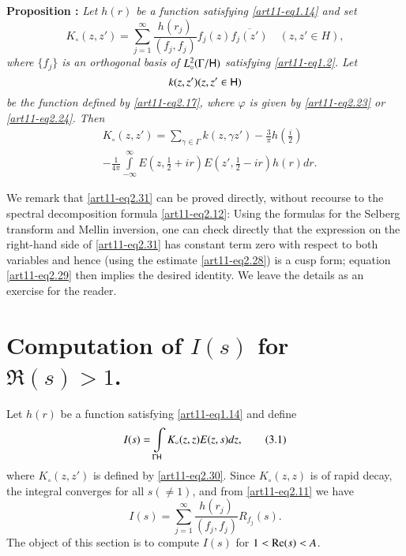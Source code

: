 \medskip
\noindent
{\bfseries Proposition :\label{art11-prop3}}
\textit{Let $h(r)$ be a function satisfying \eqref{art11-eq1.14} and set}
\begin{equation*}
K_\circ (z, z') = \sum\limits^\infty_{j=1} \frac{h(r_j)}{(f_j, f_j)} f_j (z) \overline{f_j (z')} \quad (z, z' \in H), 
\tag{2.30}\label{art11-eq2.30}
\end{equation*}
\textit{where $\{f_j\}$ is an orthogonal basis of $L^2_\circ (\Gamma / \mathsf{H})$ satisfying \eqref{art11-eq1.2}. Let 
$$
k(z,z') (z, z' \in \mathsf{H})
$$ 
be the function defined by \eqref{art11-eq2.17}, where $\varphi$ is given by \eqref{art11-eq2.23} or \eqref{art11-eq2.24}. Then}  
\begin{align*}
& K_\circ (z,z') =\sum\limits_{\gamma \in \Gamma} k (z, \gamma z') - \frac{3}{\pi} h (\frac{i}{2}) \tag{2.31} \label{art11-eq2.31}\\
& -\frac{1}{4\pi} \int\limits^\infty_{-\infty} E (z, \frac{1}{2} + ir) E (z', \frac{1}{2} - ir) h (r) dr. 
\end{align*}\pageoriginale

We remark that \eqref{art11-eq2.31} can be proved directly, without recourse to the spectral decomposition formula \eqref{art11-eq2.12}: Using the formulas for the Selberg transform and Mellin inversion, one can check directly that the expression on the right-hand side of \eqref{art11-eq2.31} has constant term zero with respect to both variables and hence (using the estimate \eqref{art11-eq2.28}) is a cusp form; equation \eqref{art11-eq2.29} then implies the desired identity. We leave the details as an exercise for the reader. 

\section{Computation of $I(s)$ for $\Re (s) >1$.}\label{art11-sec3}
Let $h(r)$ be a function satisfying \eqref{art11-eq1.14} and define 
\begin{equation*}
I(s) = \int\limits_{\Gamma \mathsf{H}} K_\circ (z, z) E (z, s) dz,  \tag{3.1}\label{art11-eq3.1}
\end{equation*}
where $K_\circ (z,z')$ is defined by \eqref{art11-eq2.30}. Since $K_\circ (z,z)$ is of rapid decay, the integral converges for all $s(\neq 1)$, and from \eqref{art11-eq2.11} we have 
\begin{equation*}
I(s) = \sum\limits^\infty_{j=1}  \frac{h(r_j)}{(f_j , f_j)} R_{f_j} (s) . \tag{3.2}\label{art11-eq3.2}
\end{equation*}
The object of this section is to compute $I(s)$ for $1 < \operatorname{Re} (s) < A$. 

